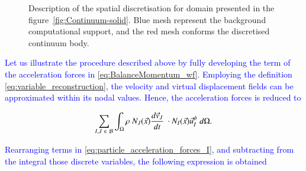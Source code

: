 \documentclass[preprint,12pt,a4paper]{elsarticle}
\newcommand{\Integral}[2]{
  \IfStrEqCase{#1}{
    {2}{\ensuremath{\int_{\Gamma_d}{#2}\ d\Gamma}}
    {3}{\ensuremath{\int_{\Omega}{#2}\ d\Omega}}
  }
}
\newcommand{\MODIFIED}[1]{
  \textcolor{blue}{{#1}}
}
\begin{document}
\begin{figure}
  \centering
  \caption{Description of the spatial discretisation for domain presented in the
    figure~\ref{fig:Continuum-solid}. Blue mesh represent the
    background computational support, and the red mesh conforms the
    discretised continuum body.}
  \label{fig:MPM-discretization}
\end{figure}
\MODIFIED{Let us illustrate the procedure described above by fully developing the term of the acceleration forces in \eqref{eq:BalanceMomentum_wf}. Employing the definition \eqref{eq:variable_reconstruction}, the velocity and virtual displacement fields can be approximated within its nodal values. Hence, the acceleration forces is reduced to}
\begin{equation}
    \label{eq:particle_acceleration_forces_I}
    \sum_{I,J\ \in\ \mathcal{B}} \Integral{3}{ \rho\ N_J(\vec{x})  \frac{d\vec{v}_J}{dt}\ \cdot N_I(\vec{x})\vec{u}_I^{\psi}}.
\end{equation}
\MODIFIED{Rearranging terms in \ref{eq:particle_acceleration_forces_I}, and subtracting from the integral those discrete variables, the following expression is obtained}
\end{document}
